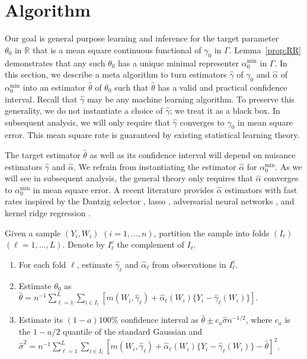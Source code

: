 \section{Algorithm}\label{sec:algorithm}

Our goal is general purpose learning and inference for the target parameter $\theta_0\text{ in }\mathbb{R}$ that is a mean square continuous functional of $\gamma_0\text{ in } \Gamma$. Lemma~\ref{prop:RR} demonstrates that any such $\theta_0$ has a unique minimal representer $\alpha_0^{\min}\text{ in } \Gamma$. In this section, we describe a meta algorithm to turn estimators $\hat{\gamma}$ of $\gamma_0$ and $\hat{\alpha}$ of $\alpha_0^{\min}$ into an estimator $\hat{\theta}$ of $\theta_0$ such that $\hat{\theta}$ has a valid and practical confidence interval. Recall that $\hat{\gamma}$ may be any machine learning algorithm. To preserve this generality, we do not instantiate a choice of $\hat{\gamma}$; we treat it as a black box. In subsequent analysis, we will only require that $\hat{\gamma}$ converges to $\gamma_0$ in mean square error. This mean square rate is guaranteed by existing statistical learning theory. %

The target estimator $\hat{\theta}$ as well as its confidence interval will depend on nuisance estimators $\hat{\gamma}$ and $\hat{\alpha}$. We refrain from instantiating the estimator $\hat{\alpha}$ for $\alpha_0^{\min}$. As we will see in subsequent analysis, the general theory only requires that $\hat{\alpha}$ converges to $\alpha^{\min}_0$ in mean square error. A recent literature provides $\hat{\alpha}$ estimators with fast rates inspired by the Dantzig selector \cite{chernozhukov2018global}, lasso \cite{chernozhukov2018learning,smucler2019unifying,avagyan2021high}, adversarial neural networks \cite{chernozhukov2020adversarial,kallus2021causal}, and kernel ridge regression \cite{singh2021debiased}.

\begin{algorithm}\label{alg:target}
Given a sample $(Y_i,W_i)$ $(i=1,...,n)$, partition the sample into folds $(I_{\ell})$ $(\ell=1,...,L)$. Denote by $I_{\ell}^c$ the complement of $I_{\ell}$.
\begin{enumerate}
    \item For each fold $\ell$, estimate $\hat{\gamma}_{\ell}$ and $\hat{\alpha}_{\ell}$ from observations in $I_{\ell}^c$.
    \item Estimate $\theta_0$ as
    $
  \hat{\theta}=n^{-1}\sum_{\ell=1}^L\sum_{i\in I_{\ell}} [m(W_i,\hat{\gamma}_{\ell})+\hat{\alpha}_{\ell}(W_i)\{Y_i-\hat{\gamma}_{\ell}(W_i)\}]
    $.
    \item Estimate its $(1-a) 100$\% confidence interval as
    $
    \hat{\theta}\pm c_{a}\hat{\sigma} n^{-1/2}$, where $c_{a}$ is the $1-a/2$ quantile of the standard Gaussian and $\hat{\sigma}^2=n^{-1}\sum_{\ell=1}^L\sum_{i\in I_{\ell}} [m(W_i,\hat{\gamma}_{\ell})+\hat{\alpha}_{\ell}(W_i)\{Y_i-\hat{\gamma}_{\ell}(W_i)\}-\hat{\theta}]^2
    $. 
\end{enumerate}
\end{algorithm}

